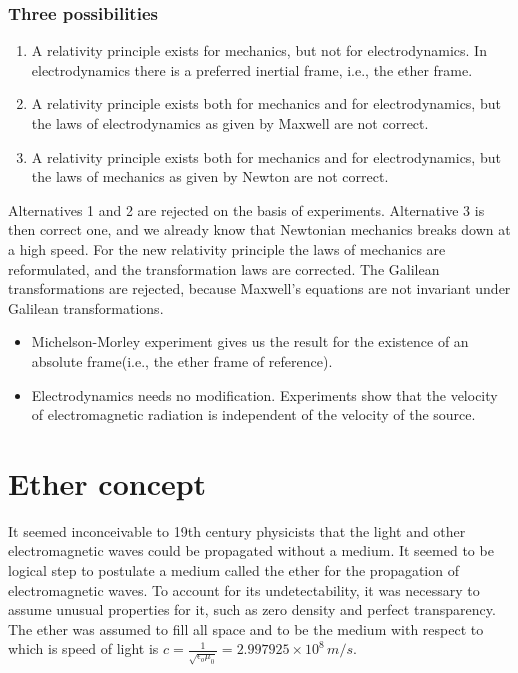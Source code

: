 \documentclass[../main-sheet.tex]{subfiles}
\begin{document}
\subsubsection{Three possibilities}
\begin{enumerate}
    \item A relativity principle exists for mechanics, but not for electrodynamics. In electrodynamics there is a preferred inertial frame, i.e., the ether frame.
    \item A relativity principle exists both for mechanics and for electrodynamics, but the laws of electrodynamics as given by Maxwell are not correct.
    \item A relativity principle exists both for mechanics and for electrodynamics, but the laws of mechanics as given by Newton are not correct.
\end{enumerate}
Alternatives 1 and 2 are rejected on the basis of experiments. Alternative 3 is then correct one, and we already know that Newtonian mechanics breaks down at a high speed. For the new relativity principle the laws of mechanics are reformulated, and the transformation laws are corrected. The Galilean transformations are rejected, because Maxwell's equations are not invariant under Galilean transformations.

\begin{itemize}
    \item Michelson-Morley experiment gives us the result for the existence of an absolute frame(i.e., the ether frame of reference).
    \item Electrodynamics needs no modification. Experiments show that the velocity of electromagnetic radiation is independent of the velocity of the source.
\end{itemize}
\section{Ether concept}
It seemed inconceivable to 19th century physicists that the light and other electromagnetic waves could be propagated without a medium. It seemed to be logical step to postulate a medium called the ether for the propagation of electromagnetic waves. To account for its undetectability, it was necessary to assume unusual properties for it, such as zero density and perfect transparency. The ether was assumed to fill all space and to be the medium with respect to which is speed of light is \(c=\frac{1}{\sqrt{\epsilon_o\mu_0}}=2.997925\times10^8\,m/s \).
\end{document}
